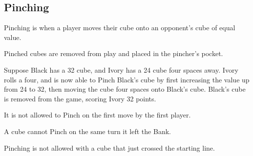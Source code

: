 \subsection{Pinching}\label{sec:pinching}
Pinching is when a player moves their cube onto an opponent's cube of equal value.

Pinched cubes are removed from play and placed in the pincher's pocket.

\example Suppose Black has a 32 cube, and Ivory has a 24 cube four spaces away. 
Ivory rolls a four, and is now able to Pinch Black's cube by first increasing the value up from 24 to 32, then moving the cube four spaces onto Black's cube.
Black's cube is removed from the game, scoring Ivory 32 points.

\note It is not allowed to Pinch on the first move by the first player.

\note A cube cannot Pinch on the same turn it left the Bank.

\note Pinching is not allowed with a cube that just crossed the starting line.